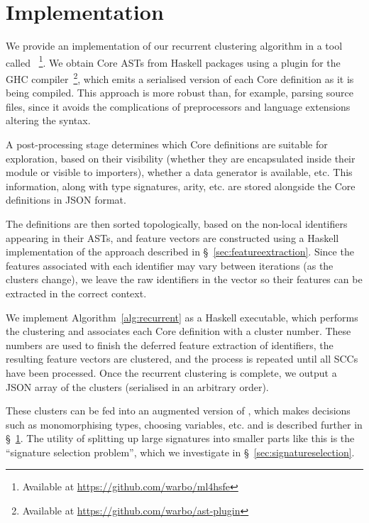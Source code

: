 \section{Implementation}
\label{sec:implementation}

We provide an implementation of our recurrent clustering algorithm in a tool
called \mlforhs{}~\footnote{Available at
  \url{https://github.com/warbo/ml4hsfe}}. We obtain Core ASTs from Haskell
packages using a plugin for the GHC compiler~\footnote{Available at
  \url{https://github.com/warbo/ast-plugin}}, which emits a serialised version
of each Core definition as it is being compiled. This approach is more robust
than, for example, parsing source files, since it avoids the complications of
preprocessors and language extensions altering the syntax.

A post-processing stage determines which Core definitions are suitable for
exploration, based on their visibility (whether they are encapsulated inside
their module or visible to importers), whether a data generator is available,
etc. This information, along with type signatures, arity, etc. are stored
alongside the Core definitions in JSON format.

The definitions are then sorted topologically, based on the non-local
identifiers appearing in their ASTs, and feature vectors are constructed using a
Haskell implementation of the approach described in
\S~\ref{sec:featureextraction}. Since the features associated with each
identifier may vary between iterations (as the clusters change), we leave the
raw identifiers in the vector so their features can be extracted in the correct
context.

We implement Algorithm~\ref{alg:recurrent} as a Haskell executable, which
performs the clustering and associates each Core definition with a cluster
number. These numbers are used to finish the deferred feature extraction of
identifiers, the resulting feature vectors are clustered, and the process is
repeated until all SCCs have been processed. Once the recurrent clustering is
complete, we output a JSON array of the clusters (serialised in an arbitrary
order).

These clusters can be fed into an augmented version of \quickspec{}, which makes
decisions such as monomorphising types, choosing variables, etc. and is
described further in \S~\ref{sec:implementation}. The utility of splitting up
large signatures into smaller parts like this is the ``signature selection
problem'', which we investigate in \S~\ref{sec:signatureselection}.

